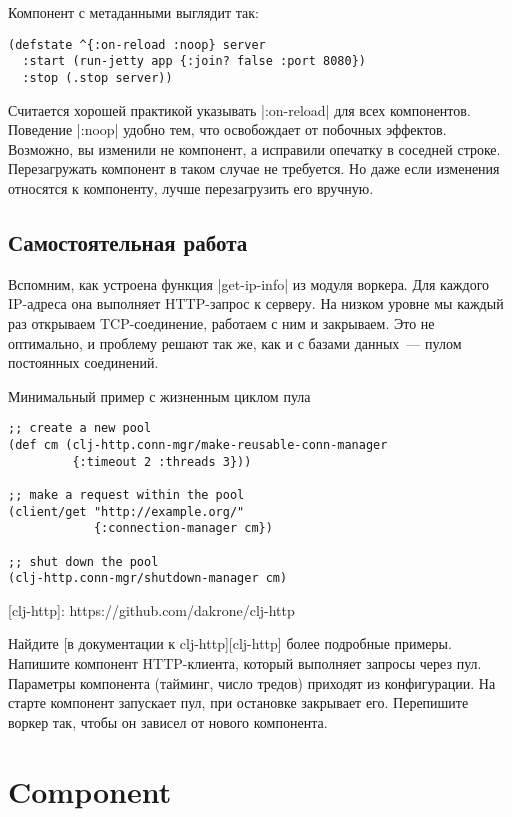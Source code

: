 Компонент с метаданными выглядит так:

\begin{verbatim}
(defstate ^{:on-reload :noop} server
  :start (run-jetty app {:join? false :port 8080})
  :stop (.stop server))
\end{verbatim}

Считается хорошей практикой указывать \spverb|:on-reload| для всех
компонентов. Поведение \spverb|:noop| удобно тем, что освобождает от побочных
эффектов. Возможно, вы изменили не компонент, а исправили опечатку в соседней
строке. Перезагружать компонент в таком случае не требуется. Но даже если
изменения относятся к компоненту, лучше перезагрузить его вручную.

\subsection{Самостоятельная работа}

Вспомним, как устроена функция \spverb|get-ip-info| из модуля воркера. Для каждого
IP-адреса она выполняет HTTP-запрос к серверу. На низком уровне мы каждый раз
открываем TCP-соединение, работаем с ним и закрываем. Это не оптимально, и
проблему решают так же, как и с базами данных~--- пулом постоянных соединений.

Минимальный пример с жизненным циклом пула

\begin{verbatim}
;; create a new pool
(def cm (clj-http.conn-mgr/make-reusable-conn-manager
         {:timeout 2 :threads 3}))

;; make a request within the pool
(client/get "http://example.org/"
            {:connection-manager cm})

;; shut down the pool
(clj-http.conn-mgr/shutdown-manager cm)
\end{verbatim}

[clj-http]: https://github.com/dakrone/clj-http

Найдите [в документации к clj-http][clj-http] более подробные примеры. Напишите
компонент HTTP-клиента, который выполняет запросы через пул. Параметры
компонента (тайминг, число тредов) приходят из конфигурации. На старте компонент
запускает пул, при остановке закрывает его. Перепишите воркер так, чтобы он
зависел от нового компонента.

\section{Component}

